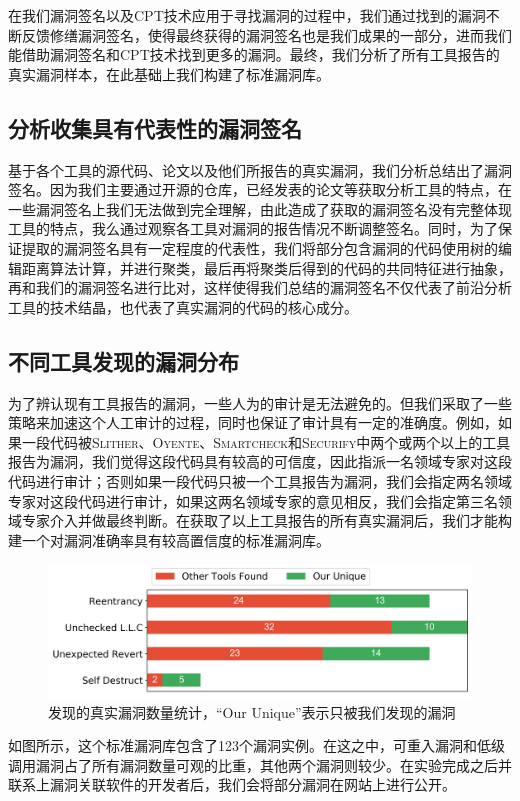 在我们漏洞签名以及CPT技术应用于寻找漏洞的过程中，我们通过找到的漏洞不断反馈修缮漏洞签名，使得最终获得的漏洞签名也是我们成果的一部分，进而我们能借助漏洞签名和CPT技术找到更多的漏洞。最终，我们分析了所有工具报告的真实漏洞样本，在此基础上我们构建了标准漏洞库。

\subsection{分析收集具有代表性的漏洞签名}

基于各个工具的源代码、论文以及他们所报告的真实漏洞，我们分析总结出了漏洞签名。因为我们主要通过开源的仓库，已经发表的论文等获取分析工具的特点，在一些漏洞签名上我们无法做到完全理解，由此造成了获取的漏洞签名没有完整体现工具的特点，我么通过观察各工具对漏洞的报告情况不断调整签名。同时，为了保证提取的漏洞签名具有一定程度的代表性，我们将部分包含漏洞的代码使用树的编辑距离算法\cite{treeEditDistance}计算，并进行聚类，最后再将聚类后得到的代码的共同特征进行抽象，再和我们的漏洞签名进行比对，这样使得我们总结的漏洞签名不仅代表了前沿分析工具的技术结晶，也代表了真实漏洞的代码的核心成分。

\subsection{不同工具发现的漏洞分布}

为了辨认现有工具报告的漏洞，一些人为的审计是无法避免的。但我们采取了一些策略来加速这个人工审计的过程，同时也保证了审计具有一定的准确度。例如，如果一段代码被\textsc{Slither}、\textsc{Oyente}、\textsc{Smartcheck}和\textsc{Securify}中两个或两个以上的工具报告为漏洞，我们觉得这段代码具有较高的可信度，因此指派一名领域专家对这段代码进行审计；否则如果一段代码只被一个工具报告为漏洞，我们会指定两名领域专家对这段代码进行审计，如果这两名领域专家的意见相反，我们会指定第三名领域专家介入并做最终判断。在获取了以上工具报告的所有真实漏洞后，我们才能构建一个对漏洞准确率具有较高置信度的标准漏洞库。
\begin{figure}
  \centering
  \includegraphics[width=\linewidth]{figures/unique_tp.png}
  \caption{发现的真实漏洞数量统计，“Our Unique”表示只被我们发现的漏洞}\label{fig:unique_tp}
\end{figure}
如图所示，这个标准漏洞库包含了123个漏洞实例。在这之中，可重入漏洞和低级调用漏洞占了所有漏洞数量可观的比重，其他两个漏洞则较少。在实验完成之后并联系上漏洞关联软件的开发者后，我们会将部分漏洞在网站上进行公开。

